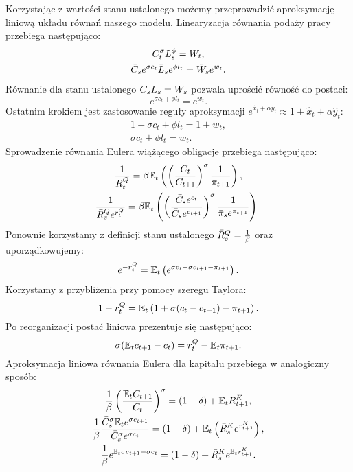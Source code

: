 Korzystając z wartości stanu ustalonego możemy przeprowadzić aproksymację liniową układu równań naszego modelu. Linearyzacja równania podaży pracy przebiega następująco:
\begin{gather}
    C_t^\sigma L_s^\phi = W_t, \\
    \bar{C}_s e^{\sigma c_t} \bar{L}_s e^{\phi l_t} = \bar{W}_s e^{w_t}.
\end{gather}
Równanie dla stanu ustalonego $\bar{C}_s\bar{L}_s = \bar{W}_s$ pozwala uprościć równość do postaci:
\begin{equation}
    e^{\sigma c_t + \phi l_t} = e^{{w_t}}.
\end{equation}
Ostatnim krokiem jest zastosowanie reguły aproksymacji $e^{\hat{x}_t + \alpha \hat{y}_t} \approx 1 + \hat{x}_t + \alpha \hat{y}_t$:
\begin{gather}
    1 + \sigma c_t + \phi l_t = 1 + w_t, \\
    \sigma c_t + \phi l_t = w_t.
\end{gather}
Sprowadzenie równania Eulera wiążącego obligacje przebiega następująco:
\begin{gather}
    \frac{1}{R^Q_t} = \beta \mathbb{E}_t \left( \left(\frac{C_t}{C_{t+1}}\right)^\sigma \frac{1}{\pi_{t+1}}\right), \\
    \frac{1}{\bar{R}_s^Qe^{r^Q_t}} = \beta \mathbb{E}_t \left( \left(\frac{\bar{C}_se^{c_t}}{\bar{C}_se^{c_{t+1}}}\right)^\sigma \frac{1}{\bar{\pi}_se^{\pi_{t+1}}}\right).
\end{gather}
Ponownie korzystamy z definicji stanu ustalonego $\bar{R}_s^Q = \frac{1}{\beta}$ oraz uporządkowujemy:
\begin{equation}
    e^{-r^Q_t} = \mathbb{E}_t \left( e^{\sigma c_t - \sigma c_{t+1}-\pi_{t+1}}\right).
\end{equation}
Korzystamy z przybliżenia przy pomocy szeregu Taylora:
\begin{equation}
    1 - r^Q_t = \mathbb{E}_t \left( 1 + \sigma(c_t - c_{t+1}) - \pi_{t+1}\right).
\end{equation}
Po reorganizacji postać liniowa prezentuje się następująco:
\begin{equation}
    \sigma(\mathbb{E}_t c_{t+1} - c_t) = r^Q_t - \mathbb{E}_t \pi_{t+1}.
\end{equation}
Aproksymacja liniowa równania Eulera dla kapitału przebiega w analogiczny sposób:
\begin{gather}
    \frac{1}{\beta} \left( \frac{\mathbb{E}_t C_{t+1}}{C_t}\right)^\sigma = (1-\delta) + \mathbb{E}_t R^K_{t+1}, \\
    \frac{1}{\beta} \frac{\bar{C}_s^\sigma \mathbb{E}_t e^{\sigma c_{t+1}}}{\bar{C}_s^\sigma e^{\sigma c_t}} 
    = 
    (1-\delta) + \mathbb{E}_t \left( \bar{R}_s^K e^{r^K_{t+1}}\right), \\
    \frac{1}{\beta} e^{\mathbb{E}_t\sigma c_{t+1} - \sigma c_t}
    = 
    (1-\delta) + \bar{R}_s^K e^{\mathbb{E}_t r^K_{t+1}}.
\end{gather}
